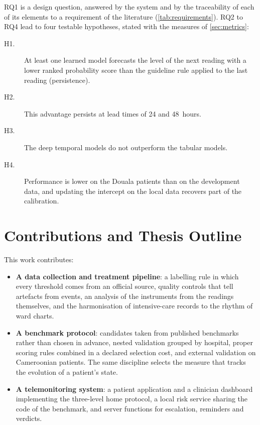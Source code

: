 \documentclass[11pt,a4paper,oneside]{report}
\begin{document}
RQ1 is a design question, answered by the system and by the traceability of each of its elements to a requirement of the literature (\cref{tab:requirements}). RQ2 to RQ4 lead to four testable hypotheses, stated with the measures of \cref{sec:metrics}:
\begin{description}
  \item[H1.] At least one learned model forecasts the level of the next reading with a lower ranked probability score than the guideline rule applied to the last reading (persistence).
  \item[H2.] This advantage persists at lead times of 24 and 48~hours.
  \item[H3.] The deep temporal models do not outperform the tabular models.
  \item[H4.] Performance is lower on the Douala patients than on the development data, and updating the intercept on the local data recovers part of the calibration.
\end{description}

\section*{Contributions and Thesis Outline}

This work contributes:
\begin{itemize}
  \item \textbf{A data collection and treatment pipeline}: a labelling rule in which every threshold comes from an official source, quality controls that tell artefacts from events, an analysis of the instruments from the readings themselves, and the harmonisation of intensive-care records to the rhythm of ward charts.
  \item \textbf{A benchmark protocol}: candidates taken from published benchmarks rather than chosen in advance, nested validation grouped by hospital, proper scoring rules combined in a declared selection cost, and external validation on Cameroonian patients. The same discipline selects the measure that tracks the evolution of a patient's state.
  \item \textbf{A telemonitoring system}: a patient application and a clinician dashboard implementing the three-level home protocol, a local risk service sharing the code of the benchmark, and server functions for escalation, reminders and verdicts.
\end{itemize}
\end{document}
